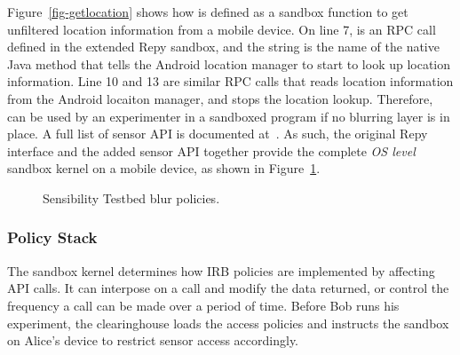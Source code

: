 Figure~\ref{fig-getlocation} shows how  
is defined as a sandbox function to get unfiltered location 
information from a mobile device. 
On line 7,  is an RPC call 
defined in the extended Repy sandbox, 
and the string  is the name of the native Java method that tells the Android 
location manager to start to look up location information. Line 10 and 13 are similar RPC 
calls that reads location information from the Android locaiton manager, and stops the location 
lookup. Therefore,  %
can be used by an experimenter in a sandboxed program if no blurring layer is in place.
A full list of sensor
API is documented at~\cite{sensor-api}. As
such, the original Repy interface and the added sensor API together 
provide the complete \textit{OS level} sandbox kernel on a mobile 
device, as shown in Figure~\ref{fig-blur}.

\begin{figure}
\caption{\small Sensibility Testbed blur policies. 
\label{fig-blur}}
\end{figure}

\subsubsection{Policy Stack}
The sandbox kernel determines how IRB policies are implemented by affecting API calls. It can
interpose on a call and modify the data returned, or control the frequency a call can be made over
a period of time. 
Before Bob runs his experiment, the clearinghouse loads the access policies and instructs the sandbox on Alice's device to
restrict sensor access accordingly. 

